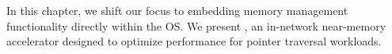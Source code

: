 In this chapter, we shift our focus to embedding memory management functionality directly within the OS. We present \pulse, an in-network near-memory accelerator designed to optimize performance for pointer traversal workloads.

